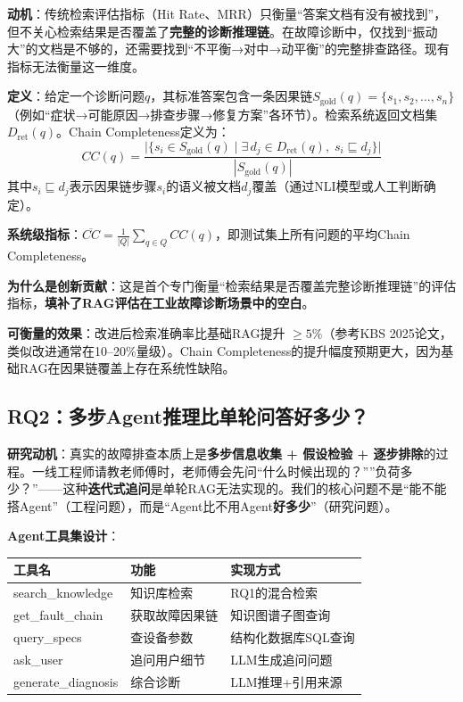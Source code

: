 \documentclass[a4paper, 11pt]{ctexart}
\begin{document}
\begin{tcolorbox}[colback=tsinghua!5, colframe=tsinghua!40, title=\textbf{原创指标：Chain Completeness (CC)}, fonttitle=\bfseries]
\textbf{动机}：传统检索评估指标（Hit Rate、MRR）只衡量``答案文档有没有被找到''，但不关心检索结果是否覆盖了\textbf{完整的诊断推理链}。在故障诊断中，仅找到``振动大''的文档是不够的，还需要找到``不平衡→对中→动平衡''的完整排查路径。现有指标无法衡量这一维度。

\textbf{定义}：给定一个诊断问题$q$，其标准答案包含一条因果链$S_{\text{gold}}(q) = \{s_1, s_2, \ldots, s_n\}$（例如``症状→可能原因→排查步骤→修复方案''各环节）。检索系统返回文档集$D_{\text{ret}}(q)$。Chain Completeness定义为：
\[
CC(q) = \frac{\bigl|\{s_i \in S_{\text{gold}}(q) \mid \exists\, d_j \in D_{\text{ret}}(q),\; s_i \sqsubseteq d_j \}\bigr|}{|S_{\text{gold}}(q)|}
\]
其中$s_i \sqsubseteq d_j$表示因果链步骤$s_i$的语义被文档$d_j$覆盖（通过NLI模型或人工判断确定）。

\textbf{系统级指标}：$\overline{CC} = \frac{1}{|Q|}\sum_{q \in Q} CC(q)$，即测试集上所有问题的平均Chain Completeness。

\textbf{为什么是创新贡献}：这是首个专门衡量``检索结果是否覆盖完整诊断推理链''的评估指标，\textbf{填补了RAG评估在工业故障诊断场景中的空白}。
\end{tcolorbox}

\textbf{可衡量的效果}：改进后检索准确率比基础RAG提升 $\geq 5\%$（参考KBS 2025论文，类似改进通常在10--20\%量级）。Chain Completeness的提升幅度预期更大，因为基础RAG在因果链覆盖上存在系统性缺陷。


\subsection{RQ2：多步Agent推理比单轮问答好多少？}

\textbf{研究动机}：真实的故障排查本质上是\textbf{多步信息收集 + 假设检验 + 逐步排除}的过程。一线工程师请教老师傅时，老师傅会先问``什么时候出现的？''''负荷多少？''——这种\textbf{迭代式追问}是单轮RAG无法实现的。我们的核心问题不是``能不能搭Agent''（工程问题），而是``Agent比不用Agent\textbf{好多少}''（研究问题）。

\textbf{Agent工具集设计}：

\begin{table}[H]
\centering
\renewcommand{\arraystretch}{1.2}
\small
\begin{tabular}{p{3.5cm} p{4cm} p{5cm}}
    \toprule
    \textbf{工具名} & \textbf{功能} & \textbf{实现方式} \\
    \midrule
    search\_knowledge & 知识库检索 & RQ1的混合检索 \\
    get\_fault\_chain & 获取故障因果链 & 知识图谱子图查询 \\
    query\_specs & 查设备参数 & 结构化数据库SQL查询 \\
    ask\_user & 追问用户细节 & LLM生成追问问题 \\
    generate\_diagnosis & 综合诊断 & LLM推理+引用来源 \\
    \bottomrule
\end{tabular}
\end{table}
\end{document}
